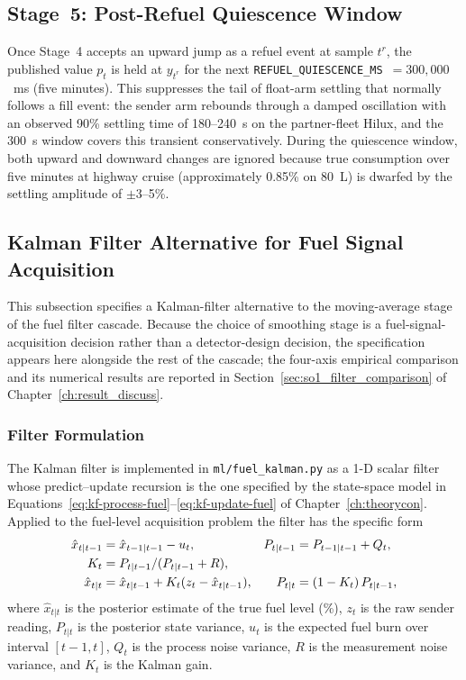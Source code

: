 \subsection{Stage~5: Post-Refuel Quiescence Window}

Once Stage~4 accepts an upward jump as a refuel event at sample $t^{r}$, the published value $p_t$ is held at $y_{t^r}$ for the next \texttt{REFUEL\_QUIESCENCE\_MS}~$= 300{,}000$~ms (five minutes). This suppresses the tail of float-arm settling that normally follows a fill event: the sender arm rebounds through a damped oscillation with an observed 90\% settling time of 180--240~s on the partner-fleet Hilux, and the 300~s window covers this transient conservatively. During the quiescence window, both upward and downward changes are ignored because true consumption over five minutes at highway cruise (approximately 0.85\% on 80~L) is dwarfed by the settling amplitude of $\pm$3--5\%.

\subsection{Kalman Filter Alternative for Fuel Signal Acquisition}
\label{sec:kalman_methodology_fuel}

This subsection specifies a Kalman-filter alternative to the moving-average stage of the fuel filter cascade. Because the choice of smoothing stage is a fuel-signal-acquisition decision rather than a detector-design decision, the specification appears here alongside the rest of the cascade; the four-axis empirical comparison and its numerical results are reported in Section~\ref{sec:so1_filter_comparison} of Chapter~\ref{ch:result_discuss}.

\subsubsection{Filter Formulation}
\label{sec:kalman_formulation}

The Kalman filter is implemented in \texttt{ml/fuel\_kalman.py} as a 1-D scalar filter whose predict--update recursion is the one specified by the state-space model in Equations~\ref{eq:kf-process-fuel}--\ref{eq:kf-update-fuel} of Chapter~\ref{ch:theorycon}. Applied to the fuel-level acquisition problem the filter has the specific form
\begin{align}
\hat{x}_{t|t-1} &= \hat{x}_{t-1|t-1} - u_t,       & P_{t|t-1} &= P_{t-1|t-1} + Q_t, \label{eq:kf-predict-fuel}\\
K_t             &= P_{t|t-1} / (P_{t|t-1} + R),   & &\notag \\
\hat{x}_{t|t}   &= \hat{x}_{t|t-1} + K_t (z_t - \hat{x}_{t|t-1}), &
P_{t|t}         &= (1 - K_t)\, P_{t|t-1}, \label{eq:kf-update-fuel}
\end{align}
where $\hat{x}_{t|t}$ is the posterior estimate of the true fuel level (\%), $z_t$ is the raw sender reading, $P_{t|t}$ is the posterior state variance, $u_t$ is the expected fuel burn over interval $[t-1,t]$, $Q_t$ is the process noise variance, $R$ is the measurement noise variance, and $K_t$ is the Kalman gain.

